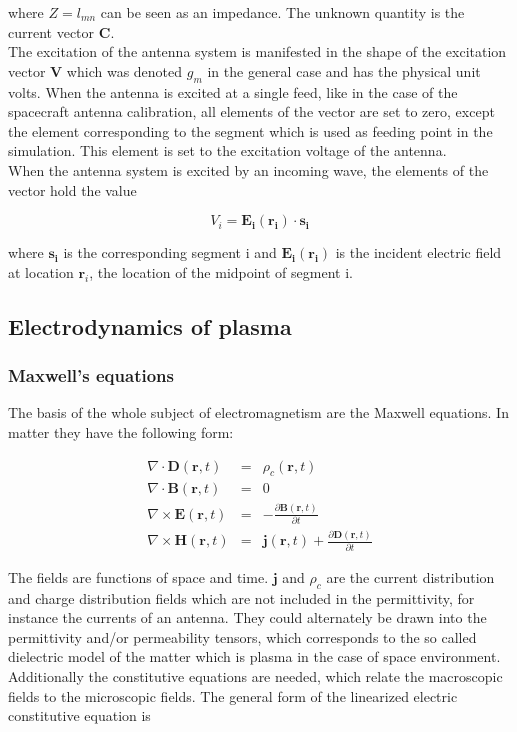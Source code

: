 \documentclass[a4paper,11pt]{article}
\begin{document}
where $Z=l_{mn}$ can be seen as an impedance. The unknown quantity is the current vector $\mathbf{C}$. \\

The excitation of the antenna system is manifested in the shape of the excitation vector $\mathbf{V}$ which was denoted $g_m$ in the general case and has the physical unit volts. When the antenna is excited at a single feed, like in the case of the spacecraft antenna calibration, all elements of the vector are set to zero, except the element corresponding to the segment which is used as feeding point in the simulation. This element is set to the excitation voltage of the antenna.\\


When the antenna system is excited by an incoming wave, the elements of the vector hold the value

\begin{equation}
 V_i=\mathbf{E_i(r_i)} \cdot \mathbf{s_i}
\end{equation}

where $\mathbf{s_i}$ is the corresponding segment i and $\mathbf{E_i(r_i)}$ is the incident electric field at location $\mathbf{r}_i$, the location of the midpoint of segment i.

\subsection{Electrodynamics of plasma}
\subsubsection{Maxwell's equations}
The basis of the whole subject of electromagnetism are the Maxwell
equations. In matter they have the following form:

\begin{eqnarray}
\nabla \cdot \mathbf{D}(\mathbf{r},t)&=&\rho_c(\mathbf{r},t) \label{maxwell1}\\
\nabla \cdot \mathbf{B}(\mathbf{r},t)&=&0 \label{maxwell2} \\
\nabla \times \mathbf{E}(\mathbf{r},t)&=&-\frac{\partial \mathbf{B}(\mathbf{r},t)}{\partial t} \label{maxwell3} \\
\nabla \times \mathbf{H}(\mathbf{r},t)&=&\mathbf{j}(\mathbf{r},t)+ \frac{\partial \mathbf{D}(\mathbf{r},t)}{\partial t} \label{maxwell4}
\end{eqnarray}

The fields are functions of space and time. $\mathbf{j}$ and
$\rho_c$ are the current distribution and charge distribution fields
which are not included in the permittivity, for instance the currents of an antenna. They could alternately be drawn into the permittivity and/or permeability tensors, which corresponds to the so called dielectric model of the matter which is plasma in the case of space environment.
Additionally the constitutive equations are needed, which relate the
macroscopic fields to the microscopic fields. The general form of the linearized electric constitutive equation is
\end{document}
